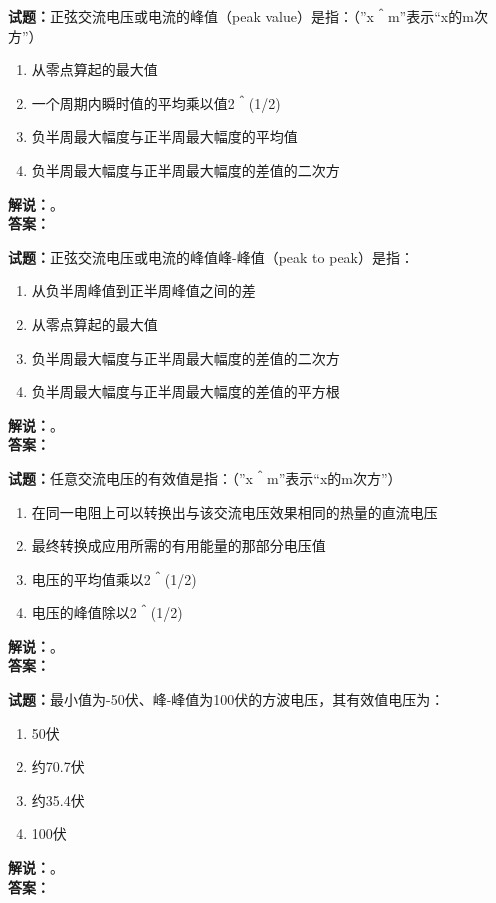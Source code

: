 \documentclass{ctexbook}
\begin{document}
\bigskip




\noindent\textbf{试题：}正弦交流电压或电流的峰值（peak value）是指：（”x＾m”表示“x的m次方”）
\begin{enumerate}[leftmargin=3em]
\item 从零点算起的最大值
\item 一个周期内瞬时值的平均乘以值2＾(1/2)
\item 负半周最大幅度与正半周最大幅度的平均值
\item 负半周最大幅度与正半周最大幅度的差值的二次方
\end{enumerate}
\noindent\textbf{解说：}\textbf{}。\\\noindent\textbf{答案：}

\bigskip




\noindent\textbf{试题：}正弦交流电压或电流的峰值峰-峰值（peak to peak）是指：
\begin{enumerate}[leftmargin=3em]
\item 从负半周峰值到正半周峰值之间的差
\item 从零点算起的最大值
\item 负半周最大幅度与正半周最大幅度的差值的二次方
\item 负半周最大幅度与正半周最大幅度的差值的平方根
\end{enumerate}
\noindent\textbf{解说：}\textbf{}。\\\noindent\textbf{答案：}

\bigskip




\noindent\textbf{试题：}任意交流电压的有效值是指：（”x＾m”表示“x的m次方”）
\begin{enumerate}[leftmargin=3em]
\item 在同一电阻上可以转换出与该交流电压效果相同的热量的直流电压
\item 最终转换成应用所需的有用能量的那部分电压值
\item 电压的平均值乘以2＾(1/2)
\item 电压的峰值除以2＾(1/2)
\end{enumerate}
\noindent\textbf{解说：}\textbf{}。\\\noindent\textbf{答案：}

\bigskip




\noindent\textbf{试题：}最小值为-50伏、峰-峰值为100伏的方波电压，其有效值电压为：
\begin{enumerate}[leftmargin=3em]
\item 50伏
\item 约70.7伏
\item 约35.4伏
\item 100伏
\end{enumerate}
\noindent\textbf{解说：}\textbf{}。\\\noindent\textbf{答案：}
\end{document}
